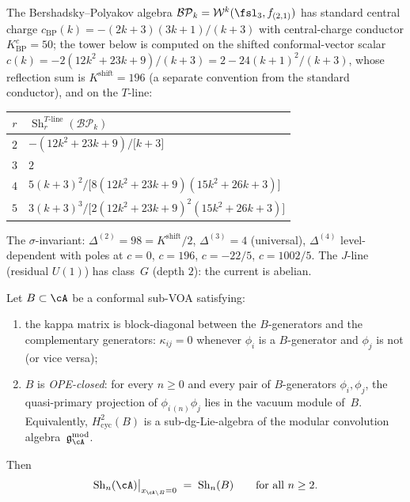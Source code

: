 \begin{computation}
\label{comp:bp-shadow-tower}
The Bershadsky--Polyakov algebra $\mathcal{BP}_k
= \mathcal{W}^k(\fsl_3, f_{(2,1)})$
has standard central charge
$c_{\mathrm{BP}}(k) = -(2k+3)(3k+1)/(k+3)$ with central-charge
conductor $K^c_{\mathrm{BP}} = 50$; the tower below is computed on the
shifted conformal-vector scalar
$c(k) = -2(12k^2 + 23k + 9)/(k+3) = 2 - 24(k+1)^2/(k+3)$,
whose reflection sum is $K^{\mathrm{shift}} = 196$
\textup{(}a separate convention from the standard
conductor\textup{)}, and on the $T$-line:
\begin{center}
\renewcommand{\arraystretch}{1.2}
\small
\begin{tabular}{cl}
\toprule
$r$ & $\operatorname{Sh}_r^{T\text{-line}}(\mathcal{BP}_k)$ \\
\midrule
$2$ & $-(12k^2+23k+9)\big/\bigl[k+3\bigr]$ \\
$3$ & $2$ \\
$4$ & $5(k+3)^2\big/\bigl[8(12k^2+23k+9)(15k^2+26k+3)\bigr]$ \\
$5$ & $3(k+3)^3\big/\bigl[2(12k^2+23k+9)^2(15k^2+26k+3)\bigr]$ \\
\bottomrule
\end{tabular}
\end{center}
The $\sigma$-invariant: $\Delta^{(2)} = 98 = K^{\mathrm{shift}}/2$,
$\Delta^{(3)} = 4$ \textup{(}universal\textup{)},
$\Delta^{(4)}$ level-dependent with poles at $c = 0$, $c = 196$,
$c = -22/5$, $c = 1002/5$.
The $J$-line \textup{(}residual $U(1)$\textup{)} has class~$G$
\textup{(}depth $2$\textup{)}: the current is abelian.
\end{computation}


\begin{theorem}
\label{thm:shadow-subalgebra-autonomy}%
%
%
Let $B \subset \cA$ be a conformal sub-VOA satisfying:
\begin{enumerate}
\item[\textup{(i)}] the kappa matrix is block-diagonal between the
 $B$-generators and the complementary generators:
 $\kappa_{ij} = 0$ whenever $\phi_i$ is a $B$-generator and $\phi_j$ is
 not (or vice versa);
\item[\textup{(ii)}] $B$ is \emph{OPE-closed}: for every $n \geq 0$ and
 every pair of $B$-generators $\phi_i, \phi_j$, the quasi-primary
 projection of $\phi_{i\,(n)}\phi_j$ lies in the vacuum module of~$B$.
 Equivalently, $H^2_{\mathrm{cyc}}(B)$ is a sub-dg-Lie-algebra of the
 modular convolution algebra~$\mathfrak{g}^{\mathrm{mod}}_{\cA}$.
\end{enumerate}
Then
\[
\mathrm{Sh}_n(\cA)\big|_{x_{\cA \setminus B} = 0}
\;=\;
\mathrm{Sh}_n(B)
\qquad \text{for all } n \geq 2.
\]
\end{theorem}


